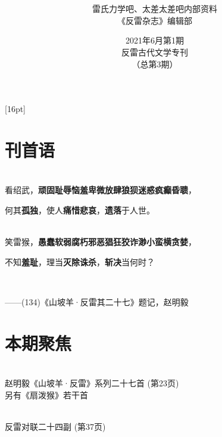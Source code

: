 \documentclass[UTF8,12pt,oneside]{ctexbook}
\title{\textbf{\fontsize{42}{84}{反雷杂志 \\[15] Anti-Lei Magazine}}}
\author{\Large \kaishu 雷氏力学吧、太差太差吧内部资料 \\[8] \Large \kaishu 《反雷杂志》编辑部 }
\date{\huge 2021年6月第1期 \\ 反雷古代文学专刊 \\ （总第3期）}
\begin{document}
    
    \maketitle %
    
    \setcounter{secnumdepth}{-2} 
    \setcounter{tocdepth}{1}
    [16pt]{\addvspace{2pt}\filright}
    {\contentspush{\thecontentslabel\hspace{0.8em}}}
    {}{\contentspage}
    
    \chapter{刊首语}
    
    \Large

    \begin{center}

        ~\\

        \noindent 看绍武，\textbf{顽固耻辱恼羞卑微放肆狼狈迷惑疯癫昏聩}，
        
        何其\textbf{孤独}，使人\textbf{痛惜悲哀}，\textbf{遗落}于人世。
        
        ~\\
        \noindent 笑雷猴，\textbf{愚蠢软弱腐朽邪恶猖狂狡诈渺小蛮横贪婪}，
        
        不知\textbf{羞耻}，理当\textbf{灭除诛杀}，\textbf{斩决}当何时？

        ~\\
    
    \end{center}

    \large
    \kaishu
    \hfill{——(134)《山坡羊·反雷其二十七》题记，赵明毅}
    \songti

    \chapter{本期聚焦}
        \begin{center}
            \Large
            \kaishu
            ~\\
            赵明毅《山坡羊·反雷》系列二十七首 (第23页)
            \\ 另有《扇泼猴》若干首
            
            ~\\
            反雷对联二十四副 (第37页)
            
            \songti
            \normalsize
        \end{center}
    
\end{document}
